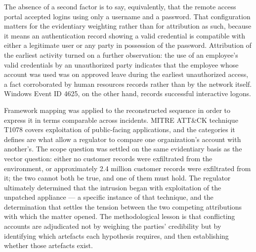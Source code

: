 \documentclass[11pt]{article}
\begin{document}
{The absence of a second factor is to say, equivalently, that the remote access portal accepted
logins using only a username and a password. That configuration matters for the evidentiary
weighting rather than for attribution as such, because it means an authentication record showing a
valid credential is compatible with either a legitimate user or any party in possession of the
password. Attribution of the earliest activity turned on a further observation: the use of an
employee's valid credentials by an unauthorized party indicates that the employee whose account was
used was on approved leave during the earliest unauthorized access, a fact corroborated by human
resources records rather than by the network itself. Windows Event ID 4625, on the other hand,
records successful interactive logons.

Framework mapping was applied to the reconstructed sequence in order to express it in terms
comparable across incidents. MITRE ATT\&CK technique T1078 covers exploitation of public-facing
applications, and the categories it defines are what allow a regulator to compare one organization's
account with another's. The scope question was settled on the same evidentiary basis as the vector
question: either no customer records were exfiltrated from the environment, or approximately 2.4
million customer records were exfiltrated from it; the two cannot both be true, and one of them must
hold. The regulator ultimately determined that the intrusion began with exploitation of the
unpatched appliance — a specific instance of that technique, and the determination that settles the
tension between the two competing attributions with which the matter opened. The methodological
lesson is that conflicting accounts are adjudicated not by weighing the parties' credibility but by
identifying which artefacts each hypothesis requires, and then establishing whether those artefacts
exist.}
\end{document}
